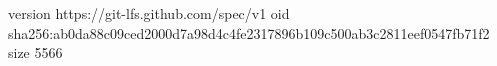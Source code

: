 version https://git-lfs.github.com/spec/v1
oid sha256:ab0da88c09ced2000d7a98d4c4fe2317896b109c500ab3c2811eef0547fb71f2
size 5566

